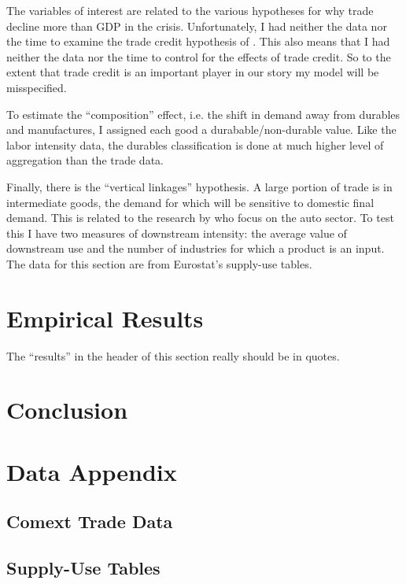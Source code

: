 \documentclass[11pt]{article}
\begin{document}
  The variables of interest are related to the various hypotheses for why trade decline more than GDP in the crisis.  Unfortunately, I had neither the data nor the time to examine the trade credit hypothesis of \cite{chor-manova:2012}.  This also means that I had neither the data nor the time to control for the effects of trade credit.  So to the extent that trade credit is an important player in our story my model will be misspecified.

  To estimate the ``composition'' effect, i.e. the shift in demand away from durables and manufactures, I assigned each good a durabable/non-durable value.  Like the labor intensity data, the durables classification is done at much higher level of aggregation than the trade data.
  
  Finally, there is the ``vertical linkages'' hypothesis. A large portion of trade is in intermediate goods, the demand for which will be sensitive to domestic final demand. This is related to the research by \cite{alessandria-kaboski:2010} who focus on the auto sector.  To test this I have two measures of downstream intensity: the average value of downstream use and the number of industries for which a product is an input.  The data for this section are from Eurostat's supply-use tables.

\section{Empirical Results} %
\label{sec:empirical_results}
  The ``results'' in the header of this section really should be in quotes.  
  
\section{Conclusion}
\label{sec:conclusion}

\section{Data Appendix}
\label{sec:data_appendix}

\subsection{Comext Trade Data} %
\label{sub:comext_trade_data}

\subsection{Supply-Use Tables} %
\label{sub:supply_use_tables}
\end{document}
